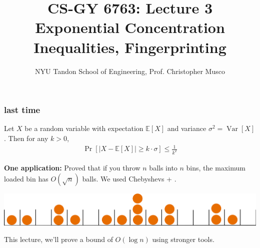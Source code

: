 \documentclass[compress]{beamer}
\title{CS-GY 6763: Lecture 3 \\  Exponential Concentration Inequalities, Fingerprinting}
\author{NYU Tandon School of Engineering, Prof. Christopher Musco}
\date{}
\newcommand{\E}{\mathbb{E}}
\DeclareMathOperator{\Var}{Var}
\begin{document}
\begin{frame}
	\titlepage 
\end{frame}


\begin{frame}[t]
	\frametitle{last time}
	\begin{lemma}
		Let $X$ be a random variable with expectation $\E[X]$ and variance $\sigma^2 = \Var[X]$. Then for any $k > 0$,
		\begin{align*}
			\Pr[|X - \E[X]| \geq k\cdot\sigma] \leq \frac{1}{k^2}
		\end{align*}
	\end{lemma}
	\vspace{-.5em}
	\textbf{One application:} Proved that if you throw $n$ balls into $n$ bins, the maximum loaded bin has $O(\sqrt{n})$  balls.  We used Chebyshevs + \underline{\hspace{10em}}.
	\begin{center}
		\includegraphics[width=.7\textwidth]{ballsinbins.png}
	\end{center}
This lecture, we'll prove a bound of $O(\log n)$ using stronger tools. 
\end{frame}
\end{document}

